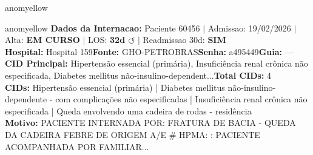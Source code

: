 \documentclass[a4paper,10pt]{article}
\begin{document}
\begin{anomalycard}[Internacao 166180 | GHO-PETROBRAS | MODERADO (z=2.70)]{anomyellow}

\end{anomalycard}

\newpage

\begin{anomalycard}[Internacao 165934 | GHO-PETROBRAS | MODERADO (z=2.69)]{anomyellow}
\textbf{Dados da Internacao:} Paciente 60456 $\mid$ Admissao: 19/02/2026 $\mid$ Alta: \textcolor{anomorange}{\textbf{EM CURSO}} $\mid$ LOS: \textbf{32d \textcolor{anomorange}{$\circlearrowleft$}} $\mid$ Readmissao 30d: \textcolor{anomred}{\textbf{SIM}}\\
\textbf{Hospital:} Hospital 159\quad\textbf{Fonte:} GHO-PETROBRAS\quad\textbf{Senha:} a495449\quad\textbf{Guia:} ---\\
\textbf{CID Principal:} {\small Hipertensão essencial (primária), Insuficiência renal crônica não especificada, Diabetes mellitus não-insulino-dependent...}\quad\textbf{Total CIDs:} 4\\

\textbf{CIDs:} {\scriptsize Hipertensão essencial (primária) | Diabetes mellitus não-insulino-dependente - com complicações não especificadas | Insuficiência renal crônica não especificada | Queda envolvendo uma cadeira de rodas - residência}\\

\textbf{Motivo:} {\scriptsize PACIENTE INTERNADA POR: FRATURA DE BACIA - QUEDA DA CADEIRA  FEBRE DE ORIGEM A/E  \# HPMA:  : PACIENTE ACOMPANHADA POR FAMILIAR...}\\


\end{anomalycard}
\end{document}
